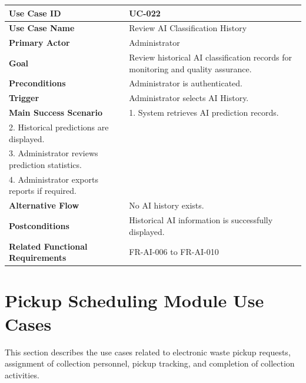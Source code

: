 \begin{longtable}{|p{4cm}|p{10cm}|}

\hline
\textbf{Use Case ID} &
UC-022 \\
\hline

\textbf{Use Case Name} &
Review AI Classification History \\
\hline

\textbf{Primary Actor} &
Administrator \\
\hline

\textbf{Goal} &
Review historical AI classification records for monitoring and quality
assurance. \\
\hline

\textbf{Preconditions} &
Administrator is authenticated. \\
\hline

\textbf{Trigger} &
Administrator selects AI History. \\
\hline

\textbf{Main Success Scenario} &
1. System retrieves AI prediction records.\\
2. Historical predictions are displayed.\\
3. Administrator reviews prediction statistics.\\
4. Administrator exports reports if required.\\
\hline

\textbf{Alternative Flow} &
No AI history exists.\\
\hline

\textbf{Postconditions} &
Historical AI information is successfully displayed.\\
\hline

\textbf{Related Functional Requirements} &
FR-AI-006 to FR-AI-010 \\
\hline

\end{longtable}

\section{Pickup Scheduling Module Use Cases}
\label{sec:pickup-usecases}

This section describes the use cases related to electronic waste pickup
requests, assignment of collection personnel, pickup tracking, and
completion of collection activities.

